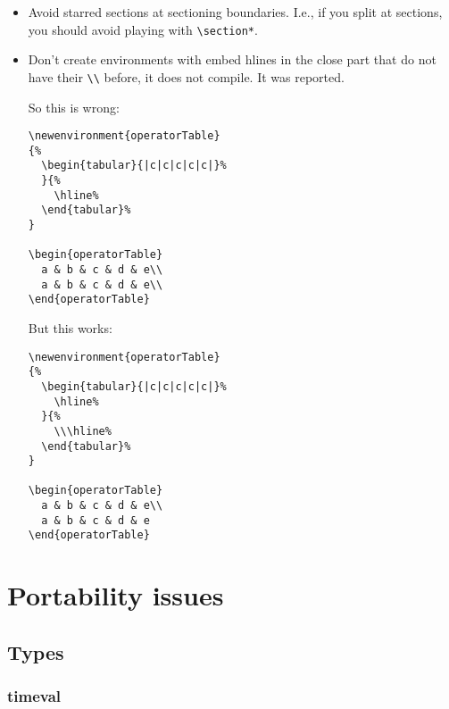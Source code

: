 \documentclass[openright,twoside,11pt]{book}
\begin{document}
\begin{itemize}
\item Avoid starred sections at sectioning boundaries.  I.e., if you
  split at sections, you should avoid playing with
  \lstinline|\section*|.

\item Don't create environments with embed hlines in the close part
  that do not have their \lstinline|\\| before, it does not compile.
  It was reported.

  So this is wrong:
\begin{lstlisting}[language={[LaTeX]TeX}]
\newenvironment{operatorTable}
{%
  \begin{tabular}{|c|c|c|c|c|}%
  }{%
    \hline%
  \end{tabular}%
}

\begin{operatorTable}
  a & b & c & d & e\\
  a & b & c & d & e\\
\end{operatorTable}
\end{lstlisting}

  But this works:
\begin{lstlisting}[language={[LaTeX]TeX}]
\newenvironment{operatorTable}
{%
  \begin{tabular}{|c|c|c|c|c|}%
    \hline%
  }{%
    \\\hline%
  \end{tabular}%
}

\begin{operatorTable}
  a & b & c & d & e\\
  a & b & c & d & e
\end{operatorTable}
\end{lstlisting}
\end{itemize}

\chapter{Portability issues}

\section{Types}
\subsection{timeval}
\end{document}
